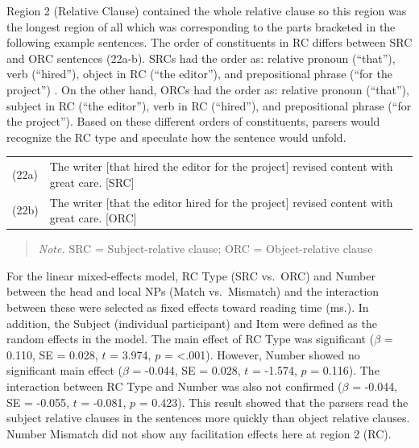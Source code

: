 \documentclass[
]{article}
\begin{document}
Region 2 (Relative Clause) contained the whole relative clause so this
region was the longest region of all which was corresponding to the
parts bracketed in the following example sentences. The order of
constituents in RC differs between SRC and ORC sentences (22a-b). SRCs
had the order as: relative pronoun (``that''), verb (``hired''), object
in RC (``the editor''), and prepositional phrase (``for the project'') .
On the other hand, ORCs had the order as: relative pronoun (``that''),
subject in RC (``the editor''), verb in RC (``hired''), and
prepositional phrase (``for the project''). Based on these different
orders of constituents, parsers would recognize the RC type and
speculate how the sentence would unfold.

\vspace{1em}
\noindent
\begin{tabular}[t]{@{}ll}
(22a) & The writer [that hired the editor for the project] revised content with great care. \hfill [SRC] \\
(22b) & The writer [that the editor hired for the project] revised content with great care. \hfill [ORC] \\
\end{tabular}

\vspace{1em}

\noindent
\begin{quote}
\small
\textit{Note.} SRC = Subject-relative clause; ORC = Object-relative clause
\end{quote}
\vspace{1em}

For the linear mixed-effects model, RC Type (SRC vs.~ORC) and Number
between the head and local NPs (Match vs.~Mismatch) and the interaction
between these were selected as fixed effects toward reading time (ms.).
In addition, the Subject (individual participant) and Item were defined
as the random effects in the model. The main effect of RC Type was
significant (\(\beta\) = 0.110, SE = 0.028, \(t\) = 3.974, \(p\) =
\textless.001). However, Number showed no significant main effect
(\(\beta\) = -0.044, SE = 0.028, \(t\) = -1.574, \(p\) = 0.116). The
interaction between RC Type and Number was also not confirmed (\(\beta\)
= -0.044, SE = -0.055, \(t\) = -0.081, \(p\) = 0.423). This result
showed that the parsers read the subject relative clauses in the
sentences more quickly than object relative clauses. Number Mismatch did
not show any facilitation effects here at region 2 (RC).
\end{document}
